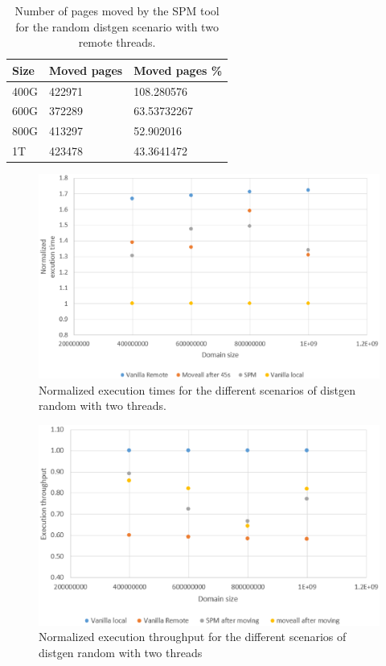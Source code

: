 \begin{table}
	\centering
		\begin{tabularx}{.8\textwidth}{|l|l|X|}
		\hline
			Size & Moved pages & Moved pages \%  \\
			\hline
			400G & 422971 & 108.280576 \\
			\hline
			600G & 372289 & 63.53732267 \\
			\hline
			800G & 413297 & 52.902016 \\
			\hline
			1T & 423478 & 43.3641472 \\
			\hline
		\end{tabularx}
		\caption{Number of pages moved by the SPM tool for the random distgen scenario with two remote threads.}
		\label{table:res-dgenmvdrdm2t}
\end{table}


\begin{figure}[th]
	\centering
		\includegraphics[width=.8\textwidth]{figures/time-dgentt-random.eps}
		\caption{Normalized execution times for the different scenarios of distgen random with two threads.}
		\label{fig:res-dgentimrdm2t}
\end{figure}

\begin{figure}[th]
	\centering
		\includegraphics[width=.8\textwidth]{figures/thrput-dgentt-randm.eps}
		\caption{Normalized execution throughput for the different scenarios of distgen random with two threads}
		\label{fig:res-dgentrgrdm2t}
\end{figure}

